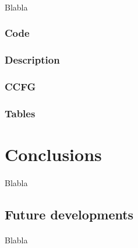 \documentclass[letterpaper,twocolumn,10pt]{article}
\begin{document}
\paragraph{}
Blabla

\subsubsection{Code}

\subsubsection{Description}

\subsubsection{CCFG}

\subsubsection{Tables}


\section{Conclusions}
\paragraph{}
Blabla

\subsection{Future developments}
\paragraph{}
Blabla


{\footnotesize 

}

\theendnotes

\end{document}
